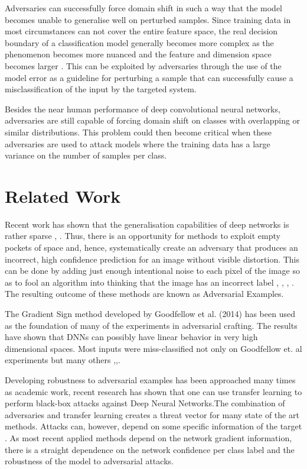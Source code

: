 \documentclass[runningheads,a4paper]{llncs}
\begin{document}
Adversaries can successfully force domain shift in such a way that the model becomes unable to generalise well on perturbed samples. Since training data in most circumstances can not cover the entire feature space, the real decision boundary of a classification model generally becomes more complex as the phenomenon becomes more nuanced and the feature and dimension space becomes larger \cite{goodfellow2016_book}. This can be exploited by adversaries through the use of the model error as a guideline for perturbing a sample that can successfully cause a misclassification of the input by the targeted system.

Besides the near human performance of deep convolutional neural networks, adversaries are still capable of forcing domain shift on classes with overlapping or similar distributions. This problem could then become critical when these adversaries are used to attack models where the training data has a large variance on the number of samples per class. 

\section{Related Work}

Recent work has shown that the generalisation capabilities of deep networks is rather sparse \cite{goodfellow2016}, \cite{papernot2016transf}. Thus, there is an opportunity for methods to exploit empty pockets of space and, hence, systematically create an adversary that produces an incorrect, high confidence prediction for an image without visible distortion. This can be done by adding just enough intentional noise to each pixel of the image so as to fool an algorithm into thinking that the image has an incorrect label \cite{goodfellow2014}, \cite{goodfellow2016}, \cite{papernot2016transf}, \cite{szegedy2013}. The resulting outcome of these methods are known as Adversarial Examples.

The Gradient Sign method developed by Goodfellow et al. (2014) has been used as the foundation of many of the experiments in adversarial crafting. The results have shown that DNNs can possibly have linear behavior in very high dimensional spaces.  Most inputs were miss-classified not only on Goodfellow et. al \cite{goodfellow2014}  experiments but many others \cite{billovits},\cite{goodfellow2016},\cite{papernot2016}.

Developing robustness to adversarial examples has been approached many times as academic work, recent research \cite{papernot2016} has shown that one can use transfer learning \cite{yosinski2014transferable} to perform black-box attacks against Deep Neural Networks.The combination of adversaries and transfer learning creates a threat vector for many state of the art methods. Attacks can, however, depend on some specific information of the target \cite{papernot2016transf}. As most recent applied methods depend on the network gradient information, there is a straight dependence on the network confidence per class label and the robustness of the model to adversarial attacks.
\end{document}
